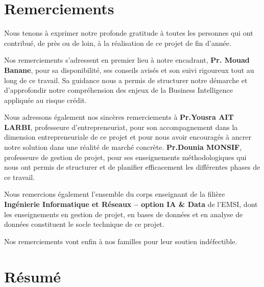 \documentclass[12pt, a4paper]{report}
\begin{document}
\setcounter{page}{1}

\chapter*{Remerciements}

Nous tenons à exprimer notre profonde gratitude à toutes les personnes
qui ont contribué, de près ou de loin, à la réalisation de ce projet de
fin d'année.

Nos remerciements s'adressent en premier lieu à notre encadrant,
\textbf{Pr. Mouad \newline Banane}, pour sa disponibilité, ses conseils avisés
et son suivi rigoureux tout au long de ce travail. Sa guidance nous a
permis de structurer notre démarche et d'approfondir notre compréhension
des enjeux de la Business Intelligence appliquée au risque crédit.

Nous adressons également nos sincères remerciements à
\textbf{Pr.Yousra AIT LARBI}, professeure d'entrepreneuriat, pour
son accompagnement dans la dimension entrepreneuriale de ce projet
et pour nous avoir encouragés à ancrer notre solution dans une
réalité de marché concrète.
\textbf{Pr.Dounia MONSIF}, professeure de
gestion de projet, pour ses enseignements méthodologiques qui nous
ont permis de structurer et de \newline planifier efficacement les différentes
phases de ce travail.

Nous remercions également l'ensemble du corps enseignant de la filière
\textbf{Ingénierie Informatique et Réseaux -- option IA \& Data} de l'EMSI,
dont les enseignements en gestion de projet, en bases de données et en
analyse de données constituent le socle technique de ce projet.

Nos remerciements vont enfin à nos familles pour leur soutien
indéfectible.












\chapter*{R\'esum\'e}
\end{document}
